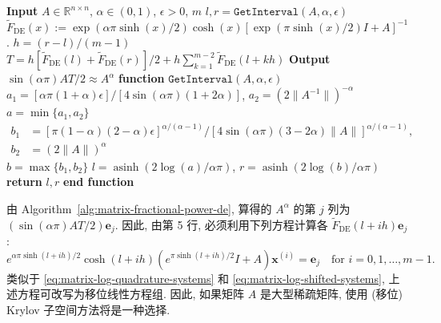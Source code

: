 \begin{algorithm}[H]\caption{{计算 $A^\alpha$ 的 $m$ 点 DE 公式}}\label{alg:matrix-fractional-power-de}\begin{algorithmic}[1]
\State \textbf{Input} $A\in\mathbb{R}^{n\times n}$, $\alpha\in(0,1)$, $\epsilon>0$, $m$
\State $l,r=\mathtt{GetInterval}(A,\alpha,\epsilon)$
 $\widetilde{F}_{\mathrm{DE}}(x):=\exp(\alpha\pi\sinh(x)/2)\cosh(x)[\exp(\pi\sinh(x)/2)I+A]^{-1}$.
\State $h=(r-l)/(m-1)$
\State $T=h[\widetilde{F}_{\mathrm{DE}}(l)+\widetilde{F}_{\mathrm{DE}}(r)]/2+h\sum_{k=1}^{m-2}\widetilde{F}_{\mathrm{DE}}(l+kh)$
\State \textbf{Output} $\sin(\alpha\pi)AT/2\approx A^\alpha$
\State{}
\State \textbf{function} $\mathtt{GetInterval}(A,\alpha,\epsilon)$
\State $a_1=[\alpha\pi(1+\alpha)\epsilon]/[4\sin(\alpha\pi)(1+2\alpha)]$, $a_2=(2\|A^{-1}\|)^{-\alpha}$
\State $a=\min\{a_1,a_2\}$
\State $\begin{aligned}b_1&=[\pi(1-\alpha)(2-\alpha)\epsilon]^{\alpha/(\alpha-1)}/[4\sin(\alpha\pi)(3-2\alpha)\|A\|]^{\alpha/(\alpha-1)},\\b_2&=(2\|A\|)^\alpha\end{aligned}$
\State $b=\max\{b_1,b_2\}$
\State $l=\operatorname{asinh}(2\log(a)/\alpha\pi)$, $r=\operatorname{asinh}(2\log(b)/\alpha\pi)$
\State \textbf{return} $l,r$
\State \textbf{end function}
\end{algorithmic}\end{algorithm}

{由 Algorithm~\ref{alg:matrix-fractional-power-de}, 算得的 $A^\alpha$ 的第 $j$ 列为 $(\sin(\alpha\pi)AT/2)\boldsymbol{e}_j$. 因此, 由第 5 行, 必须利用下列方程计算各 $\widetilde{F}_{\mathrm{DE}}(l+ih)\boldsymbol{e}_j$:}
\[e^{\alpha\pi\sinh(l+ih)/2}\cosh(l+ih)(e^{\pi\sinh(l+ih)/2}I+A)\boldsymbol{x}^{(i)}=\boldsymbol{e}_j\quad\text{for }i=0,1,\ldots,m-1.\]
{类似于 \eqref{eq:matrix-log-quadrature-systems} 和 \eqref{eq:matrix-log-shifted-systems}, 上述方程可改写为移位线性方程组. 因此, 如果矩阵 $A$ 是大型稀疏矩阵, 使用 (移位) Krylov 子空间方法将是一种选择.}

